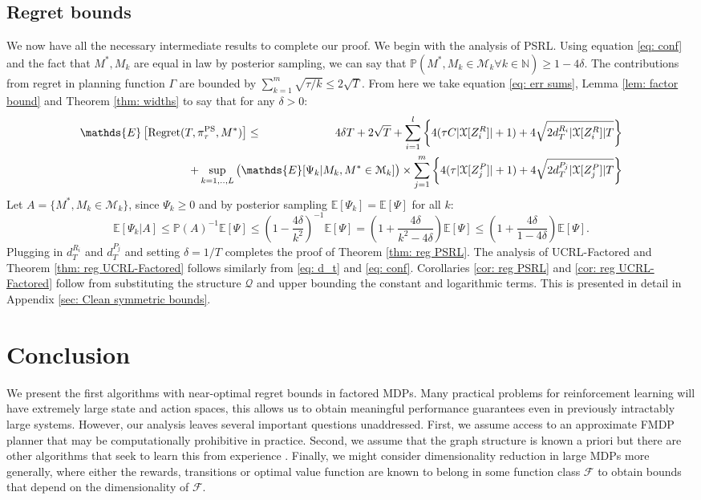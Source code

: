 \documentclass{article}
\newcommand{\Exp}{\mathds{E}}
\newcommand{\Prob}{\mathds{P}}
\newcommand{\Nat}{\mathbb{N}}
\newcommand{\Xc}{\mathcal{X}}
\newcommand{\Qc}{\mathcal{Q}}
\newcommand{\Fc}{\mathcal{F}}
\newcommand{\Mc}{\mathcal{M}}
\begin{document}
\subsection{Regret bounds}
\label{sec: bounds}
We now have all the necessary intermediate results to complete our proof.
We begin with the analysis of PSRL.
Using equation \eqref{eq: conf} and the fact that $M^*,M_k$ are equal in law by posterior sampling, we can say that $\Prob( M^*, M_k \in \Mc_k \forall k \in \Nat) \ge 1-4\delta$.
The contributions from regret in planning function $\Gamma$ are bounded by $ \sum_{k=1}^m \sqrt{\tau/k} \le 2\sqrt{T}$.
From here we take equation \eqref{eq: err sums}, Lemma \ref{lem: factor bound} and Theorem \ref{thm: widths} to say that for any $\delta > 0 $:
\begin{eqnarray*}
	\Exp \left[\mathrm{Regret}(T, \pi^{\rm PS}_{\tau}, M^*) \right] &\le& 4\delta T +2 \sqrt{T} +
		\sum_{i=1}^l \left\{ 4(\tau C |\Xc[Z^R_i]| + 1) + 4\sqrt{2d_T^{R_i} | \Xc[Z^R_i]| T} \right\} \\
	&& \hspace{-25mm} + \sup_{k=1,..,L} \big( \Exp[\Psi_k | M_k, M^* \in \Mc_k] \big) \times \sum_{j=1}^m \left\{ 4(\tau |\Xc[Z^P_j]| + 1) + 4\sqrt{2d_T^{P_j} | \Xc[Z^P_j]| T} \right\}
\end{eqnarray*}
Let $A = \{ M^*, M_k \in \Mc_k \}$, since $\Psi_k \ge 0$ and by posterior sampling $\Exp [ \Psi_k ] = \Exp [\Psi]$ for all $k$:
$$\Exp[ \Psi_k \vert A  ] \le \Prob(A)^{-1} \Exp[\Psi] \le \left( 1 - \frac{4 \delta}{k^2} \right)^{-1} \Exp[ \Psi ] = \left(1 + \frac{4\delta}{k^2 - 4\delta} \right) \Exp[ \Psi ] \le \left(1 + \frac{4\delta}{1 - 4\delta} \right) \Exp[ \Psi ].$$
Plugging in $d_T^{R_i}$ and $d_T^{P_j}$ and setting $\delta=1/T$ completes the proof of Theorem \ref{thm: reg PSRL}.
The analysis of UCRL-Factored and Theorem \ref{thm: reg UCRL-Factored} follows similarly from \eqref{eq: d_t} and \eqref{eq: conf}.
Corollaries \ref{cor: reg PSRL} and \ref{cor: reg UCRL-Factored} follow from substituting the structure $\Qc$ and upper bounding the constant and logarithmic terms.
This is presented in detail in Appendix \ref{sec: Clean symmetric bounds}.

\section{Conclusion}
We present the first algorithms with near-optimal regret bounds in factored MDPs.
Many practical problems for reinforcement learning will have extremely large state and action spaces, this allows us to obtain meaningful performance guarantees even in previously intractably large systems.
However, our analysis leaves several important questions unaddressed.
First, we assume access to an approximate FMDP planner that may be computationally prohibitive in practice.
Second, we assume that the graph structure is known a priori but there are other algorithms that seek to learn this from experience \cite{strehl2007efficient,diuk2009adaptive}.
Finally, we might consider dimensionality reduction in large MDPs more generally, where either the rewards, transitions or optimal value function are known to belong in some function class $\Fc$ to obtain bounds that depend on the dimensionality of $\Fc$.
\end{document}
